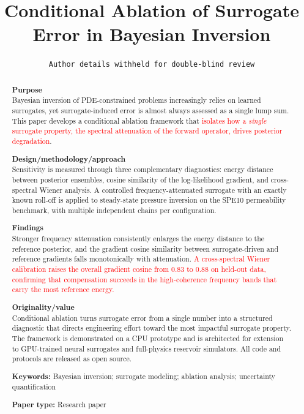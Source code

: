 \documentclass[12pt]{article}
\title{\bfseries Conditional Ablation of Surrogate Error in Bayesian Inversion}
\author{\texttt{Author details withheld for double-blind review}}
\date{}
\newcommand{\add}[1]{\textcolor{red}{#1}}
\begin{document}
\maketitle

\begin{abstract}
\noindent\textbf{Purpose}\\
Bayesian inversion of PDE-constrained problems increasingly relies on learned surrogates, yet surrogate-induced error is almost always assessed as a single lump sum. This paper develops a conditional ablation framework that \add{isolates how a \emph{single} surrogate property, the spectral attenuation of the forward operator, drives posterior degradation}.

\noindent\textbf{Design/methodology/approach}\\
Sensitivity is measured through three complementary diagnostics: energy distance between posterior ensembles, cosine similarity of the log-likelihood gradient, and cross-spectral Wiener analysis. A controlled frequency-attenuated surrogate with an exactly known roll-off is applied to steady-state pressure inversion on the SPE10 permeability benchmark, with multiple independent chains per configuration.

\noindent\textbf{Findings}\\
Stronger frequency attenuation consistently enlarges the energy distance to the reference posterior, and the gradient cosine similarity between surrogate-driven and reference gradients falls monotonically with attenuation. \add{A cross-spectral Wiener calibration raises the overall gradient cosine from $0.83$ to $0.88$ on held-out data, confirming that compensation succeeds in the high-coherence frequency bands that carry the most reference energy.}

\noindent\textbf{Originality/value}\\
Conditional ablation turns surrogate error from a single number into a structured diagnostic that directs engineering effort toward the most impactful surrogate property. The framework is demonstrated on a CPU prototype and is architected for extension to GPU-trained neural surrogates and full-physics reservoir simulators. All code and protocols are released as open source.

\medskip
\noindent\textbf{Keywords:} Bayesian inversion; surrogate modeling; ablation analysis; uncertainty quantification

\medskip
\noindent\textbf{Paper type:} Research paper
\end{abstract}
\end{document}
